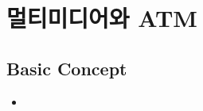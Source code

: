 



\clearpage
\chapter{멀티미디어와 ATM}

\section{Basic Concept}
\begin{itemize}
\item 
\end{itemize}




